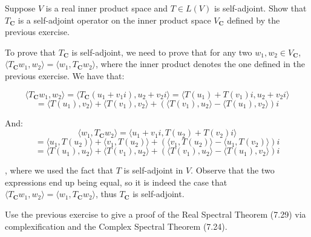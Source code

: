 \begin{exercise}{4}
    Suppose $V$ is a real inner product space and $T \in L(V)$ is self-adjoint. Show that $T_\mathbf{C}$ is a self-adjoint operator on the inner product space $V_\mathbf{C}$ defined by the previous exercise.
\end{exercise}

\begin{solution}

    To prove that $T_\mathbf{C}$ is self-adjoint, we need to prove that for any two $w_1, w_2 \in V_\mathbf{C}$, $\langle T_\mathbf{C}w_1, w_2 \rangle = \langle w_1, T_\mathbf{C}w_2 \rangle$, where the inner product denotes the one defined in the previous exercise. We have that:

    $$\langle T_\mathbf{C}w_1, w_2 \rangle = \langle T_\mathbf{C}(u_1 + v_1i), u_2 + v_2i \rangle = \langle T(u_1) + T(v_1)i, u_2 + v_2 i \rangle $$
    $$= \langle T(u_1), v_2 \rangle + \langle T(v_1), v_2 \rangle + (\langle T(v_1), u_2 \rangle - \langle T(u_1), v_2 \rangle)i$$

    And:
    $$\langle w_1, T_\mathbf{C}w_2 \rangle = \langle u_1 + v_1i, T(u_2) + T(v_2)i \rangle $$
    $$= \langle u_1, T(u_2) \rangle + \langle v_1, T(u_2) \rangle + (\langle v_1, T(u_2) \rangle - \langle u_1, T(v_2) \rangle)i$$
    $$=\langle T(u_1), u_2 \rangle + \langle T(v_1), u_2 \rangle + (\langle T(v_1), u_2\rangle - \langle T(u_1), v_2 \rangle)i$$

    , where we used the fact that $T$ is self-adjoint in $V$. Observe that the two expressions end up being equal, so it is indeed the case that $\langle T_\mathbf{C}w_1, w_2 \rangle = \langle w_1, T_\mathbf{C} w_2 \rangle$, thus $T_\mathbf{C}$ is self-adjoint.
\end{solution}

\begin{exercise}{5}
    Use the previous exercise to give a proof of the Real Spectral Theorem (7.29) via complexification and the Complex Spectral Theorem (7.24).
\end{exercise}

